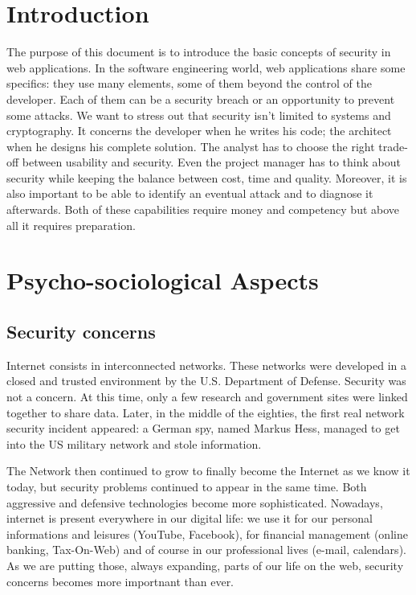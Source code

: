 
\section{Introduction}

The purpose of this document is to introduce the basic concepts of
security in web applications. In the software engineering world, web
applications share some specifics: they use many elements, some of them
beyond the control of the developer. Each of them can be a security
breach or an opportunity to prevent some attacks. We want to stress
out that security isn't limited to systems and cryptography. It
concerns the developer when he writes his code; the architect when he
designs his complete solution. The analyst has to choose
the right trade-off between usability and security. Even the project
manager has to think about security while keeping the balance between
cost, time and quality. Moreover, it is also important to be able to
identify an eventual attack and to diagnose it afterwards. Both of
these capabilities require money and competency but above all it
requires preparation.

\section{Psycho-sociological Aspects}

\subsection{Security concerns}

Internet consists in interconnected networks. These networks were developed in
a closed and trusted environment by the U.S. Department of Defense.
Security was not a concern. At this time, only a few research and government
sites were linked together to share data. Later, in the middle of the
eighties, the first real network security incident appeared: a German
spy, named Markus Hess, managed to get into the US military network and
stole information.

The Network then continued to grow to finally become the Internet as we know
it today, but security problems continued to appear in the same time. Both
aggressive and defensive technologies become more sophisticated.
Nowadays, internet is present everywhere in our digital life: we use it
for our personal informations and leisures (YouTube, Facebook), for financial
management (online banking, Tax-On-Web) and of course in our professional
lives (e-mail, calendars). As we are putting those, always expanding,
parts of our life on the web, security concerns becomes more
importnant than ever.

